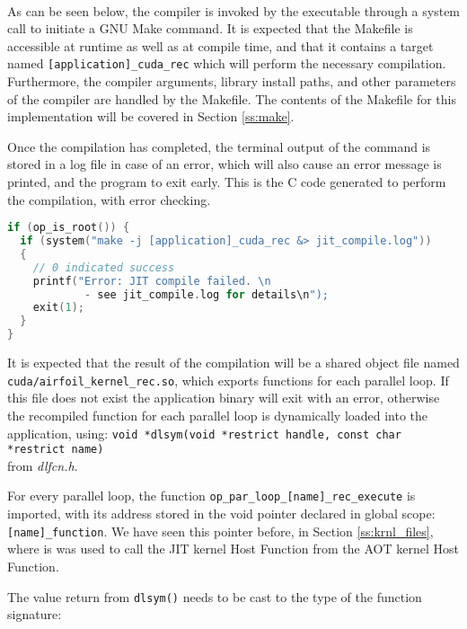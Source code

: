 \\
As can be seen below, the compiler is invoked by the executable through a system call to initiate a GNU Make \cite{make} command. It is expected that the Makefile is accessible at runtime as well as at compile time, and that it contains a target named \verb|[application]_cuda_rec| which will perform the necessary compilation. Furthermore, the compiler arguments, library install paths, and other parameters of the compiler are handled by the Makefile. The contents of the Makefile for this implementation will be covered in Section \ref{ss:make}.\par
Once the compilation has completed, the terminal output of the command is stored in a log file in case of an error, which will also cause an error message is printed, and the program to exit early.
\clearpage
\noindent This is the C code generated to perform the compilation, with error checking.
\vspace{1em}
\begin{lstlisting}[backgroundcolor=\color{red!20}, language=C]
if (op_is_root()) {
  if (system("make -j [application]_cuda_rec &> jit_compile.log"))
  {
    // 0 indicated success
    printf("Error: JIT compile failed. \n
            - see jit_compile.log for details\n");
    exit(1);
  }
}
\end{lstlisting}
\par
\noindent It is expected that the result of the compilation will be a shared object file named\\ \verb|cuda/airfoil_kernel_rec.so|, which exports functions for each parallel loop. If this file does not exist the application binary will exit with an error, otherwise the recompiled function for each parallel loop is dynamically loaded into the application, using: \verb|void *dlsym(void *restrict handle, const char *restrict name)|\\ from \textit{dlfcn.h}.
\par
\noindent For every parallel loop, the function \verb|op_par_loop_[name]_rec_execute| is imported, with its address stored in the void pointer declared in global scope: \verb|[name]_function|. We have seen this pointer before, in Section \ref{ss:krnl_files}, where is was used to call the JIT kernel Host Function from the AOT kernel Host Function.
\par
The value return from \verb|dlsym()| needs to be cast to the type of the function signature: \\
